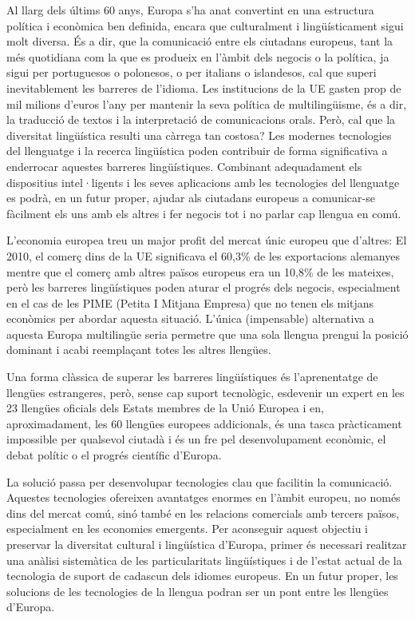 \documentclass[]{../../metanetpaper}
\begin{document}
\begin{multicols}{2}

Al llarg dels últims 60 anys, Europa s'ha anat convertint en una estructura política i econòmica ben definida, encara que culturalment i lingüísticament sigui molt diversa. És a dir, que la comunicació entre els ciutadans europeus,
tant la més quotidiana com la que es produeix en l'àmbit dels negocis o la política, ja sigui per portuguesos o polonesos, o per italians o islandesos, cal que superi inevitablement les barreres de l'idioma. Les institucions de la UE gasten prop de mil milions d'euros l'any per mantenir la seva política de multilingüisme, és a dir, la traducció de textos i la interpretació de comunicacions orals. Però, cal que la diversitat lingüística resulti una càrrega tan costosa? Les modernes tecnologies del llenguatge i la recerca lingüística poden contribuir de forma significativa a enderrocar aquestes barreres lingüístiques. Combinant adequadament els dispositius intel·ligents i les seves aplicacions amb les tecnologies del llenguatge es podrà, en un futur proper, ajudar als ciutadans europeus a comunicar-se fàcilment els uns amb els altres i fer negocis tot i no parlar cap llengua en comú.


L'economia europea treu un major profit del mercat únic europeu que d'altres: El 2010, el comerç dins de la UE significava el 60,3\% de les exportacions alemanyes mentre que el comerç amb altres països europeus era un 10,8\% de les mateixes, però les barreres lingüístiques poden aturar el progrés dels negocis, especialment en el cas de les PIME (Petita I Mitjana Empresa) que no tenen els mitjans econòmics per abordar aquesta situació. L'única (impensable) alternativa a aquesta Europa multilingüe seria permetre que una sola llengua prengui la posició dominant i acabi reemplaçant totes les altres llengües.

Una forma clàssica de superar les barreres lingüístiques és l'aprenentatge de llengües estrangeres, però, sense cap suport tecnològic, esdevenir un expert en les 23 llengües oficials dels Estats membres de la Unió Europea i en, aproximadament, les 60 llengües europees addicionals, és una tasca pràcticament impossible per qualsevol ciutadà i és un fre pel desenvolupament econòmic, el debat polític o el progrés científic d’Europa.

La solució passa per desenvolupar tecnologies clau que facilitin la comunicació. Aquestes tecnologies ofereixen avantatges enormes  en l'àmbit europeu, no només dins del mercat comú, sinó també en les relacions comercials amb tercers països, especialment en les economies emergents. Per aconseguir aquest objectiu i preservar la diversitat cultural i lingüística d'Europa, primer és necessari realitzar una anàlisi sistemàtica de les particularitats lingüístiques i de l'estat actual de la tecnologia de suport de cadascun dels idiomes europeus. En un futur proper, les solucions de les tecnologies de la llengua podran ser un pont entre les llengües d'Europa.


\end{multicols}
\end{document}
